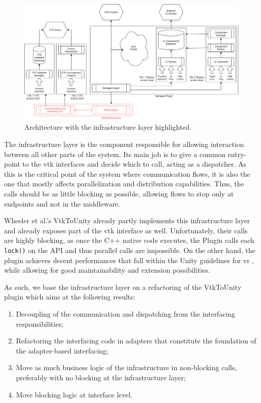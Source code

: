\begin{figure}[!t]
    \centering
    \includegraphics[width=\textwidth]{pictures/Architecture-v0.3-infra.png}
    \caption{Architecture with the infrastructure layer highlighted.}
    \label{fig:arch-infra}
\end{figure}

The infrastructure layer is the component responsible for allowing interaction between all other parts of the system. Its main job is to give a common entry-point to the \acrshort{vtk} interfaces and decide which to call, acting as a dispatcher. As this is the critical point of the system where communication flows, it is also the one that mostly affects parallelization and distribution capabilities. Thus, the calls should be as little blocking as possible, allowing flows to stop only at endpoints and not in the middleware.

Wheeler et al.'s VtkToUnity \cite{wheeler_virtual_2018} already partly implements this infrastructure layer and already exposes part of the \acrshort{vtk} interface as well. Unfortunately, their calls are highly blocking, as once the C++ native code executes, the Plugin calls each \verb|lock()| on the API and thus parallel calls are impossible. On the other hand, the plugin achieves decent performances that fall within the Unity guidelines for \acrshort{vr} \cite{unity_vr_2020}, while allowing for good maintainability and extension possibilities.

As such, we base the infrastructure layer on a refactoring of the VtkToUnity plugin which aims at the following results:

\begin{enumerate}
    \item Decoupling of the communication and dispatching from the interfacing responsibilities;
    \item Refactoring the interfacing code in adapters that constitute the foundation of the adapter-based interfacing;
    \item Move as much business logic of the infrastructure in non-blocking calls, preferably with no blocking at the infrastructure layer;
    \item Move blocking logic at interface level.
\end{enumerate}


